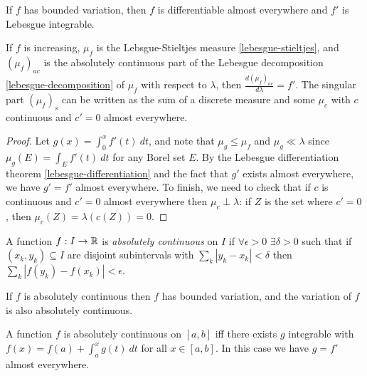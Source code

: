 \documentclass[letterpaper,11pt]{report}
\begin{document}
\begin{cor} If $f$ has bounded variation, then $f$ is differentiable almost everywhere and $f'$ is Lebesgue integrable.
\end{cor}

\begin{cor} If $f$ is increasing, $\mu_f$ is the Lebsgue-Stieltjes measure \ref{lebesgue-stieltjes}, and $(\mu_f)_{ac}$ is the absolutely continuous part of the Lebesgue decomposition \ref{lebesgue-decomposition} of $\mu_f$ with respect to $\lambda$, then $\frac{d(\mu_f)_{ac}}{d\lambda} = f'$. The singular part $(\mu_f)_s$ can be written as the sum of a discrete measure and some $\mu_c$ with $c$ continuous and $c' = 0$ almost everywhere.
\end{cor}
\begin{proof} Let $g(x) = \int_0^x f'(t)\ dt$, and note that $\mu_g \le \mu_f$ and $\mu_g \ll \lambda$ since $\mu_g(E) = \int_E f'(t)\ dt$ for any Borel set $E$. By the Lebesgue differentiation theorem \ref{lebesgue-differentiation} and the fact that $g'$ exists almost everywhere, we have $g' = f'$ almost everywhere. To finish, we need to check that if $c$ is continuous and $c' = 0$ almost everywhere then $\mu_c \perp \lambda$: if $Z$ is the set where $c' = 0$, then $\mu_c(Z) = \lambda(c(Z)) = 0$.
\end{proof}

\begin{defn} A function $f : I \rightarrow \mathbb{R}$ is \emph{absolutely continuous} on $I$ if $\forall \epsilon > 0$ $\exists \delta > 0$ such that if $(x_k,y_k) \subseteq I$ are disjoint subintervals with $\sum_k |y_k - x_k| < \delta$ then $\sum_k |f(y_k) - f(x_k)| < \epsilon$.
\end{defn}

\begin{prop} If $f$ is absolutely continuous then $f$ has bounded variation, and the variation of $f$ is also absolutely continuous.
\end{prop}

\begin{thm}\label{fundamental-lebesgue-integral} A function $f$ is absolutely continuous on $[a,b]$ iff there exists $g$ integrable with $f(x) = f(a) + \int_a^x g(t)\ dt$ for all $x \in [a,b]$. In this case we have $g = f'$ almost everywhere.
\end{thm}
\end{document}
